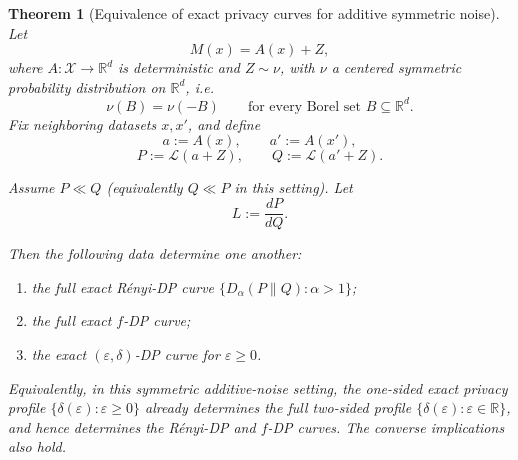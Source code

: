 \documentclass[11pt]{article}
\newtheorem{theorem}{Theorem}
\begin{document}
\begin{theorem}[Equivalence of exact privacy curves for additive symmetric noise]
Let
\[
M(x)=A(x)+Z,
\]
where \(A:\mathcal X\to \mathbb R^d\) is deterministic and \(Z\sim \nu\), with \(\nu\) a centered symmetric probability distribution on \(\mathbb R^d\), i.e.
\[
\nu(B)=\nu(-B)\qquad \text{for every Borel set }B\subseteq \mathbb R^d.
\]
Fix neighboring datasets \(x,x'\), and define
\[
a:=A(x),\qquad a':=A(x'),
\]
\[
P:=\mathcal L(a+Z),\qquad Q:=\mathcal L(a'+Z).
\]

Assume \(P\ll Q\) (equivalently \(Q\ll P\) in this setting). Let
\[
L:=\frac{dP}{dQ}.
\]

Then the following data determine one another:
\begin{enumerate}
\item the full exact R\'enyi-DP curve \(\{D_\alpha(P\|Q):\alpha>1\}\);
\item the full exact \(f\)-DP curve;
\item the exact \((\varepsilon,\delta)\)-DP curve for \(\varepsilon\ge 0\).
\end{enumerate}

Equivalently, in this symmetric additive-noise setting, the one-sided exact privacy profile \(\{\delta(\varepsilon):\varepsilon\ge 0\}\) already determines the full two-sided profile \(\{\delta(\varepsilon):\varepsilon\in\mathbb R\}\), and hence determines the R\'enyi-DP and \(f\)-DP curves. The converse implications also hold.
\end{theorem}
\end{document}
